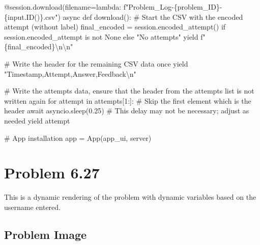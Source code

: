 \documentclass[
  letterpaper,
  DIV=11,
  numbers=noendperiod]{scrreprt}
\newenvironment{Shaded}{\begin{snugshade}}{\end{snugshade}}
\newcommand{\NormalTok}[1]{\textcolor[rgb]{0.00,0.23,0.31}{#1}}
\begin{document}
\begin{Shaded}
\begin{Highlighting}[]
\NormalTok{    @session.download(filename=lambda: f"Problem\_Log{-}\{problem\_ID\}{-}\{input.ID()\}.csv")}
\NormalTok{    async def download():}
\NormalTok{        \# Start the CSV with the encoded attempt (without label)}
\NormalTok{        final\_encoded = session.encoded\_attempt() if session.encoded\_attempt is not None else "No attempts"}
\NormalTok{        yield f"\{final\_encoded\}\textbackslash{}n\textbackslash{}n"}
        
\NormalTok{        \# Write the header for the remaining CSV data once}
\NormalTok{        yield "Timestamp,Attempt,Answer,Feedback\textbackslash{}n"}
        
\NormalTok{        \# Write the attempts data, ensure that the header from the attempts list is not written again}
\NormalTok{        for attempt in attempts[1:]:  \# Skip the first element which is the header}
\NormalTok{            await asyncio.sleep(0.25)  \# This delay may not be necessary; adjust as needed}
\NormalTok{            yield attempt}


\NormalTok{\# App installation}
\NormalTok{app = App(app\_ui, server)}
\end{Highlighting}
\end{Shaded}

\chapter*{Problem 6.27}\label{problem-6.27}


This is a dynamic rendering of the problem with dynamic variables based
on the username entered.

\section*{Problem Image}\label{problem-image-49}

\end{document}
